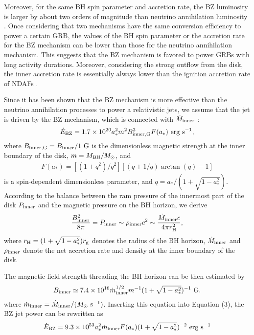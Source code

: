 \documentclass[twocolumn]{aastex6}
\def\beq{\begin{eqnarray}}
\def\eeq{\end{eqnarray}}
\begin{document}
Moreover, for the same BH spin parameter and accretion rate, the BZ luminosity is larger by about two orders of magnitude than neutrino annihilation luminosity \citep[e.g.,][]{Kawanaka2013,Liu2015,Lei2017}. Once considering that two mechanisms have the same conversion efficiency to power a certain GRB, the values of the BH spin parameter or the accretion rate for the BZ mechanism can be lower than those for the neutrino annihilation mechanism. This suggests that the BZ mechanism is favored to power GRBs with long activity durations. Moreover, considering the strong outflow from the disk, the inner accretion rate is essentially always lower than the ignition accretion rate of NDAFs \citep[for $a_* =0.95$ and the viscosity parameter $\alpha =0.1$, the ignition accretion rate is about 0.021 $M_\odot~\rm s^{-1}$, where $M_\odot$ is the mass of Sun, see e.g.,][]{Chen2007,Zalamea2011,Liu2017}.

Since it has been shown that the BZ mechanism is more effective than the neutrino annihilation processes to power a relativistic jets, we assume that the jet is driven by the BZ mechanism, which is connected with $\dot M_{\rm inner}$ \citep{Blandford1977,Lee2000a,Lee2000b}:
\beq
\dot{E}_{\rm BZ}=1.7\times10^{20}a_*^{2}m^{2}B_{\rm inner, G}^{2}F(a_*)~{\rm erg~s^{-1}},
\eeq
where $B_{\rm inner, G}=B_{\rm inner}/1~\rm G$ is the dimensionless magnetic strength at the inner boundary of the disk, $m=M_{\rm BH}/M_{\odot}$, and
\beq
F(a_*)=[(1+q^{2})/q^{2}][(q+1/q)\arctan(q)-1]
\eeq
is a spin-dependent dimensionless parameter, and $q=a_*/(1+\sqrt{1-a_*^{2}})$. According to the balance between the ram pressure of the innermost part of the disk $P_{\rm inner}$ and the magnetic pressure on the BH horizon, we derive
\beq
\frac{B_{\rm inner}^{2}}{8\pi}=P_{\rm inner} \sim \rho_{\rm inner} c^{2}\sim\frac{\dot{M}_{\rm inner}c}{4\pi r_{\rm H}^{2}},
\eeq
where $r_{\rm H}=(1+\sqrt{1-a_*^{2}})r_{\rm g}$ denotes the radius of the BH horizon, $\dot{M}_{\rm inner}$ and $\rho_{\rm inner}$ denote the net accretion rate and density at the inner boundary of the disk.

The magnetic field strength threading the BH horizon can be then estimated by
\beq
B_{\rm inner}\simeq 7.4\times10^{16}  \dot{m}_{\rm inner}^{1/2} m^{-1}(1+\sqrt{1-a_*^{2}})^{-1}~ \rm G.
\eeq
where $\dot{m}_{\rm inner}=\dot{M}_{\rm inner}/(M_{\odot}~\rm s^{-1})$. Inserting this equation into Equation (3), the BZ jet power can be rewritten as
\beq
\dot{E}_{\rm BZ}=9.3\times10^{53}a_*^{2}\dot{m}_{\rm inner} F(a_*)(1+\sqrt{1-a_*^{2}})^{-2}~{\rm erg~s^{-1}}
\label{eq:BZ}
\eeq
\end{document}
